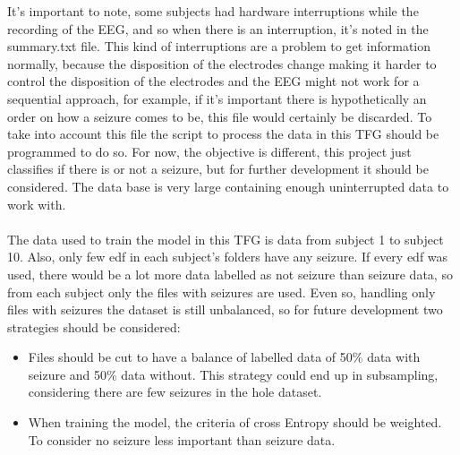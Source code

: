 It’s important to note, some subjects had hardware interruptions while the recording of the EEG, and so when there is an interruption, it’s noted in the summary.txt file. This kind of interruptions are a problem to get information normally, because the disposition of the electrodes change making it harder to control the disposition of the electrodes and the EEG might not work for a sequential approach, for example, if it’s important there is hypothetically an order on how a seizure comes to be, this file would certainly be discarded. To take into account this file the script to process the data in this TFG should be programmed to do so. For now, the objective is different, this project just classifies if there is or not a seizure, but for further development it should be considered. The data base is very large containing enough uninterrupted data to work with.
\\\\
The data used to train the model in this TFG is data from subject 1 to subject 10. Also, only few edf in each subject’s folders have any seizure. If every edf was used, there would be a lot more data labelled as not seizure than seizure data, so from each subject only the files with seizures are used. Even so, handling only files with seizures the dataset is still unbalanced, so for future development two strategies should be considered:
\\
\begin{itemize}
  \item Files should be cut to have a balance of labelled data of 50\% data with seizure and 50\% data without. This strategy could end up in subsampling, considering there are few seizures in the hole dataset.
  \item When training the model, the criteria of cross Entropy should be weighted. To consider no seizure less important than seizure data.
\end{itemize}
\leavevmode\\
